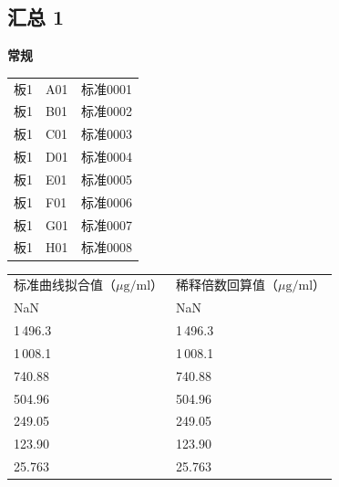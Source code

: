 \documentclass[UTF8,10pt,a4paper,fontset=fandol]{ctexart}
\newcommand{\fieldvalue}[1]{#1}
\begin{document}
\subsection{汇总 1}

\noindent\textbf{常规}

\begin{tabular}{lll}
板1 & A01 & 标准0001 \\
板1 & B01 & 标准0002 \\
板1 & C01 & 标准0003 \\
板1 & D01 & 标准0004 \\
板1 & E01 & 标准0005 \\
板1 & F01 & 标准0006 \\
板1 & G01 & 标准0007 \\
板1 & H01 & 标准0008 \\
\end{tabular}

\medskip

\begin{tabular}{ll}
标准曲线拟合值（$\mu\mathrm{g}/\mathrm{ml}$） & 稀释倍数回算值（$\mu\mathrm{g}/\mathrm{ml}$）\\
\fieldvalue{NaN}
&
\fieldvalue{NaN}
\\
\fieldvalue{1\,496.3}
&
\fieldvalue{1\,496.3}
\\
\fieldvalue{1\,008.1}
&
\fieldvalue{1\,008.1}
\\
\fieldvalue{740.88}
&
\fieldvalue{740.88}
\\
\fieldvalue{504.96}
&
\fieldvalue{504.96}
\\
\fieldvalue{249.05}
&
\fieldvalue{249.05}
\\
\fieldvalue{123.90}
&
\fieldvalue{123.90}
\\
\fieldvalue{25.763}
&
\fieldvalue{25.763}
\end{tabular}
\end{document}
